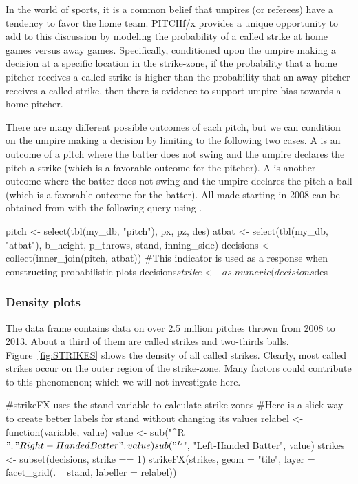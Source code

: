 \begin{article}
In the world of sports, it is a common belief that umpires (or referees)
have a tendency to favor the home team. PITCHf/x provides a unique
opportunity to add to this discussion by modeling the probability
of a called strike at home games versus away games. Specifically,
conditioned upon the umpire making a decision at a specific location
in the strike-zone, if the probability that a home pitcher receives
a called strike is higher than the probability that an away pitcher
receives a called strike, then there is evidence to support umpire
bias towards a home pitcher.

There are many different possible outcomes of each pitch, but we can
condition on the umpire making a decision by limiting to the following
two cases. A  is an outcome of a pitch where the
batter does not swing and the umpire declares the pitch a strike (which
is a favorable outcome for the pitcher). A  is another
outcome where the batter does not swing and the umpire declares the
pitch a ball (which is a favorable outcome for the batter). All 
made starting in 2008 can be obtained from  with the
following query using .
%
\begin{Schunk}
\begin{Sinput}
pitch <- select(tbl(my_db, "pitch"), px, pz, des)
atbat <- select(tbl(my_db, "atbat"), b_height, p_throws, stand, inning_side)
decisions <- collect(inner_join(pitch, atbat))
#This indicator is used as a response when constructing probabilistic plots
decisions$strike <- as.numeric(decisions$des %
\end{Sinput}
\end{Schunk}
%


\subsubsection{Density plots}

The  data frame contains data on over 2.5 million
pitches thrown from 2008 to 2013. About a third of them are called
strikes and two-thirds balls. Figure~\ref{fig:STRIKES} shows the
density of all called strikes. Clearly, most called strikes occur
on the outer region of the strike-zone. Many factors could contribute
to this phenomenon; which we will not investigate here.
%
\begin{Schunk}
\begin{Sinput}
#strikeFX uses the stand variable to calculate strike-zones 
#Here is a slick way to create better labels for stand without changing its values
relabel <- function(variable, value) { 
  value <- sub("^R$", "Right-Handed Batter", value) 
  sub("^L$", "Left-Handed Batter", value) 
}
strikes <- subset(decisions, strike == 1)
strikeFX(strikes, geom = "tile", layer = facet_grid(. ~ stand, labeller = relabel))
\end{Sinput}
\end{Schunk}
%


\end{article}
